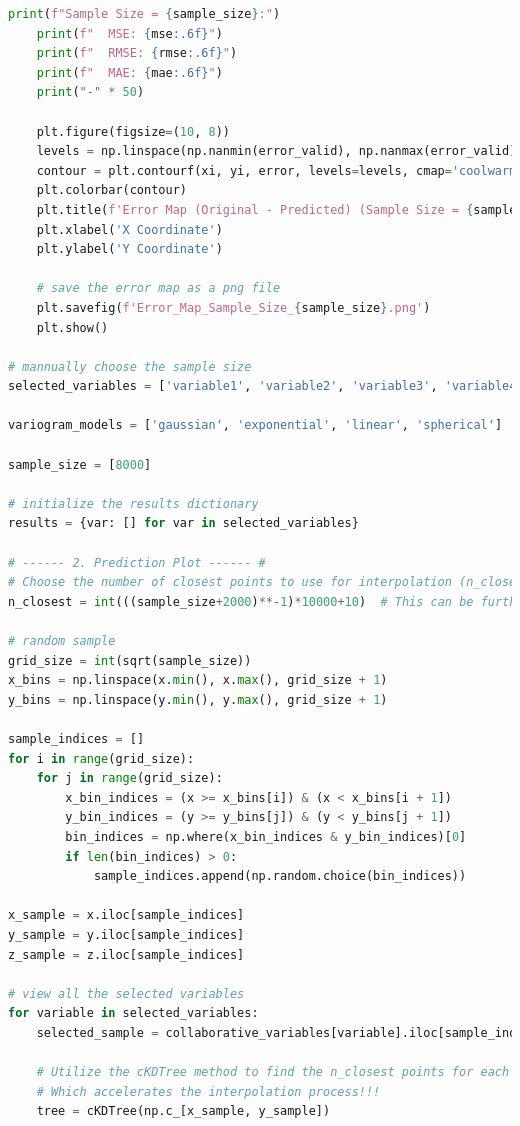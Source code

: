 \documentclass{swmcmthesis}
\begin{document}
\begin{lstlisting}[language=python,caption={The python programme for Problem 3 - Co-Kriging}]
    print(f"Sample Size = {sample_size}:")
    print(f"  MSE: {mse:.6f}")
    print(f"  RMSE: {rmse:.6f}")
    print(f"  MAE: {mae:.6f}")
    print("-" * 50)

    plt.figure(figsize=(10, 8))
    levels = np.linspace(np.nanmin(error_valid), np.nanmax(error_valid), 20)
    contour = plt.contourf(xi, yi, error, levels=levels, cmap='coolwarm')  
    plt.colorbar(contour) 
    plt.title(f'Error Map (Original - Predicted) (Sample Size = {sample_size})')
    plt.xlabel('X Coordinate')
    plt.ylabel('Y Coordinate')

    # save the error map as a png file
    plt.savefig(f'Error_Map_Sample_Size_{sample_size}.png')
    plt.show()

# mannually choose the sample size
selected_variables = ['variable1', 'variable2', 'variable3', 'variable4']  # 选择所有协作变量

variogram_models = ['gaussian', 'exponential', 'linear', 'spherical']

sample_size = [8000]

# initialize the results dictionary
results = {var: [] for var in selected_variables}

# ------ 2. Prediction Plot ------ #
# Choose the number of closest points to use for interpolation (n_closest) based on the sample size
n_closest = int(((sample_size+2000)**-1)*10000+10)  # This can be further examined and optimized based on the data

# random sample
grid_size = int(sqrt(sample_size))
x_bins = np.linspace(x.min(), x.max(), grid_size + 1)
y_bins = np.linspace(y.min(), y.max(), grid_size + 1)

sample_indices = []
for i in range(grid_size):
    for j in range(grid_size):
        x_bin_indices = (x >= x_bins[i]) & (x < x_bins[i + 1])
        y_bin_indices = (y >= y_bins[j]) & (y < y_bins[j + 1])
        bin_indices = np.where(x_bin_indices & y_bin_indices)[0]
        if len(bin_indices) > 0:
            sample_indices.append(np.random.choice(bin_indices))

x_sample = x.iloc[sample_indices]
y_sample = y.iloc[sample_indices]
z_sample = z.iloc[sample_indices]

# view all the selected variables
for variable in selected_variables:
    selected_sample = collaborative_variables[variable].iloc[sample_indices]

    # Utilize the cKDTree method to find the n_closest points for each grid point.
    # Which accelerates the interpolation process!!!
    tree = cKDTree(np.c_[x_sample, y_sample])


\end{lstlisting}
\end{document}
